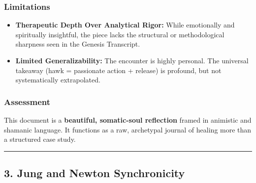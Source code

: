 \documentclass{article}
\begin{document}
\subsubsection*{\texorpdfstring{\textbf{Limitations}}{Limitations}}\label{limitations-1}

\begin{itemize}
\item
  \textbf{Therapeutic Depth Over Analytical Rigor:} While emotionally and spiritually insightful, the piece lacks the structural or methodological sharpness seen in the Genesis Transcript.
\item
  \textbf{Limited Generalizability:} The encounter is highly personal. The universal takeaway (hawk = passionate action + release) is profound, but not systematically extrapolated.
\end{itemize}

\subsubsection*{\texorpdfstring{\textbf{Assessment}}{Assessment}}\label{assessment-1}

This document is a \textbf{beautiful, somatic-soul reflection} framed in animistic and shamanic language. It functions as a raw, archetypal journal of healing more than a structured case study.

\begin{center}\rule{0.5\linewidth}{0.5pt}\end{center}

\subsection*{}\label{section-6}

\subsection*{}\label{section-7}

\subsection*{}\label{section-8}

\subsection*{\texorpdfstring{ \textbf{3. Jung and Newton Synchronicity}}{ 3. Jung and Newton Synchronicity}}\label{jung-and-newton-synchronicity}
\end{document}
